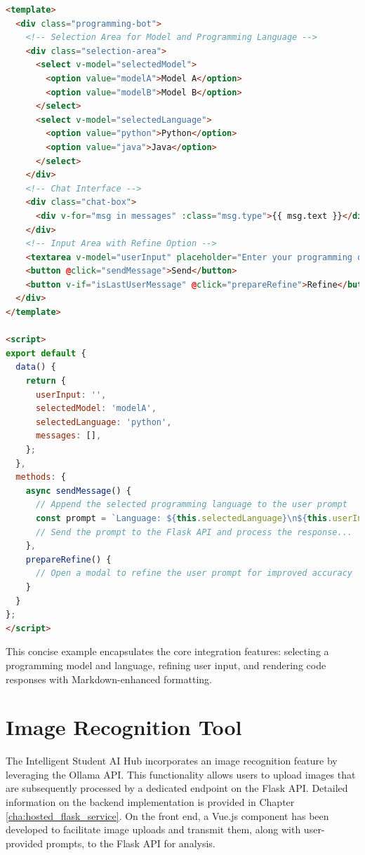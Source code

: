 \begin{lstlisting}[language=html, caption={Abbreviated Vue.js Component for the Programming Bot}, frame=single]
<template>
  <div class="programming-bot">
    <!-- Selection Area for Model and Programming Language -->
    <div class="selection-area">
      <select v-model="selectedModel">
        <option value="modelA">Model A</option>
        <option value="modelB">Model B</option>
      </select>
      <select v-model="selectedLanguage">
        <option value="python">Python</option>
        <option value="java">Java</option>
      </select>
    </div>
    <!-- Chat Interface -->
    <div class="chat-box">
      <div v-for="msg in messages" :class="msg.type">{{ msg.text }}</div>
    </div>
    <!-- Input Area with Refine Option -->
    <textarea v-model="userInput" placeholder="Enter your programming question..."></textarea>
    <button @click="sendMessage">Send</button>
    <button v-if="isLastUserMessage" @click="prepareRefine">Refine</button>
  </div>
</template>

<script>
export default {
  data() {
    return {
      userInput: '',
      selectedModel: 'modelA',
      selectedLanguage: 'python',
      messages: [],
    };
  },
  methods: {
    async sendMessage() {
      // Append the selected programming language to the user prompt
      const prompt = `Language: ${this.selectedLanguage}\n${this.userInput}`;
      // Send the prompt to the Flask API and process the response...
    },
    prepareRefine() {
      // Open a modal to refine the user prompt for improved accuracy
    }
  }
};
</script>
\end{lstlisting}

This concise example encapsulates the core integration features: selecting a programming model and language, refining user input, 
and rendering code responses with Markdown-enhanced formatting.

\section{Image Recognition Tool}

The Intelligent Student AI Hub incorporates an image recognition feature by leveraging the Ollama API. 
This functionality allows users to upload images that are subsequently processed by a dedicated endpoint on the Flask API. 
Detailed information on the backend implementation is provided in Chapter \ref{cha:hosted_flask_service}. 
On the front end, a Vue.js component has been developed to facilitate image uploads and transmit them, along with user-provided prompts, to the Flask API for analysis.

